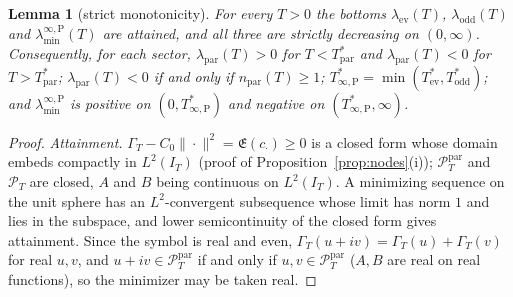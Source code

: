 \documentclass[11pt]{amsart}
\newtheorem{lemma}[theorem]{Lemma}
\theoremstyle{definition}
\theoremstyle{remark}
\newcommand{\PT}{\mathcal P_T}
\newcommand{\IT}{I_T}
\newcommand{\Lev}{\mathfrak E}
\newcommand{\laminfP}{\lambda^{\infty,\mathrm P}_{\min}}
\begin{document}
\begin{lemma}[strict monotonicity]\label{lem:strict}
For every $T>0$ the bottoms $\lambda_{\mathrm{ev}}(T)$, $\lambda_{\mathrm{odd}}(T)$ and
$\laminfP(T)$ are attained, and all three are strictly decreasing on $(0,\infty)$. Consequently, for each
sector, $\lambda_{\mathrm{par}}(T)>0$ for $T<T^*_{\mathrm{par}}$ and $\lambda_{\mathrm{par}}(T)<0$ for
$T>T^*_{\mathrm{par}}$; $\lambda_{\mathrm{par}}(T)<0$ if and only if $n_{\mathrm{par}}(T)\ge1$;
$T^*_{\infty,\mathrm P}=\min(T^*_{\mathrm{ev}},T^*_{\mathrm{odd}})$; and $\laminfP$ is positive on
$(0,T^*_{\infty,\mathrm P})$ and negative on $(T^*_{\infty,\mathrm P},\infty)$.
\end{lemma}
\begin{proof}
\emph{Attainment.} $\Gamma_T-C_0\|\cdot\|^2=\Lev(c_\cdot)\ge0$ is a closed form whose domain embeds
compactly in $L^2(\IT)$ (proof of Proposition~\ref{prop:nodes}(i)); $\PT^{\mathrm{par}}$ and $\PT$ are
closed, $A$ and $B$ being continuous on $L^2(\IT)$. A minimizing sequence on the unit sphere has an
$L^2$-convergent subsequence whose limit has norm $1$ and lies in the subspace, and lower semicontinuity
of the closed form gives attainment. Since the symbol is real and even, $\Gamma_T(u+iv)=\Gamma_T(u)+\Gamma_T(v)$
for real $u,v$, and $u+iv\in\PT^{\mathrm{par}}$ if and only if $u,v\in\PT^{\mathrm{par}}$ ($A,B$ are real on
real functions), so the minimizer may be taken real.


\end{proof}
\end{document}
